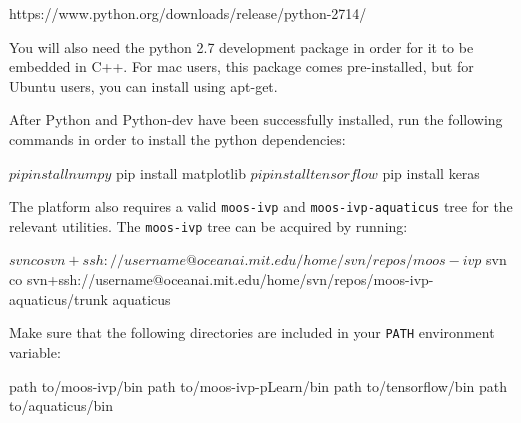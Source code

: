 \documentclass[onecolumn,letterpaper,11pt]{article}
\begin{document}
\vspace{0.15in}
https://www.python.org/downloads/release/python-2714/
\vspace{0.15in}
 
 You will also need the python 2.7 development package in order for it to be embedded in C++. For mac users, this package comes pre-installed, but for Ubuntu users, you can install using apt-get.%





\vspace{0.15in}
\vspace{0.15in}


After Python and Python-dev have been successfully installed, run the following commands in order to install the python dependencies:

\vspace{0.15in}
\begin{fileverb} 
$ pip install numpy
$ pip install matplotlib
$ pip install tensorflow
$ pip install keras
\end{fileverb}
\vspace{0.15in}

The platform also requires a valid \texttt{moos-ivp} and \texttt{moos-ivp-aquaticus} tree for the relevant utilities. The \texttt{moos-ivp} tree can be acquired by running:

\vspace{0.15in}
\begin{fileverb} 
$ svn co svn+ssh://{username}@oceanai.mit.edu/home/svn/repos/moos-ivp
$ svn co svn+ssh://{username}@oceanai.mit.edu/home/svn/repos/moos-ivp-aquaticus/trunk aquaticus
\end{fileverb}
\vspace{0.15in}

Make sure that the following directories are included in your \texttt{PATH} environment variable: 

\vspace{0.15in}
\begin{fileverb}
{path to}/moos-ivp/bin
{path to}/moos-ivp-pLearn/bin
{path to}/tensorflow/bin
{path to}/aquaticus/bin
\end{fileverb}
\vspace{0.15in}
	
\end{document}
